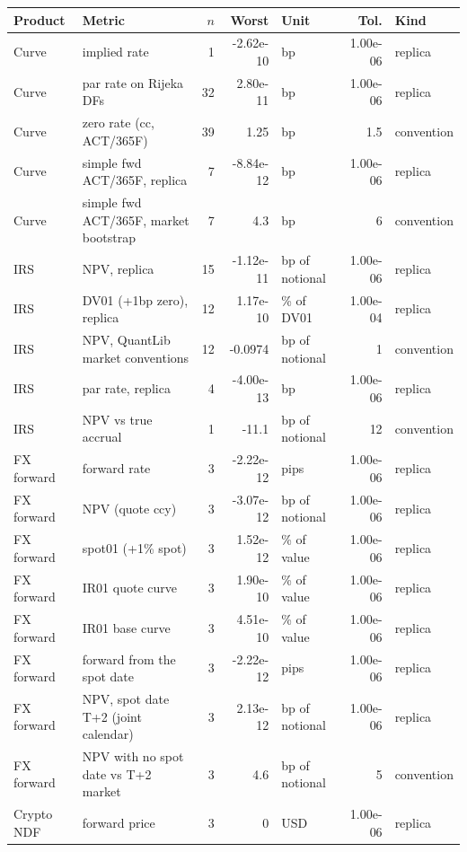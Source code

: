 \documentclass[11pt,a4paper]{article}
\begin{document}
{\small\setlength{\tabcolsep}{4pt}
\begin{longtable}{>{\raggedright\arraybackslash}p{2.2cm}>{\raggedright\arraybackslash}p{4.6cm} r r >{\raggedright\arraybackslash}p{1.8cm} r >{\raggedright\arraybackslash}p{1.8cm}}
\toprule
Product & Metric & $n$ & Worst & Unit & Tol. & Kind\\
\midrule
\endhead
Curve & implied rate & 1 & -2.62e-10 & bp & 1.00e-06 & replica \\
Curve & par rate on Rijeka DFs & 32 & 2.80e-11 & bp & 1.00e-06 & replica \\
Curve & zero rate (cc, ACT/365F) & 39 & 1.25 & bp & 1.5 & convention \\
Curve & simple fwd ACT/365F, replica & 7 & -8.84e-12 & bp & 1.00e-06 & replica \\
Curve & simple fwd ACT/365F, market bootstrap & 7 & 4.3 & bp & 6 & convention \\
IRS & NPV, replica & 15 & -1.12e-11 & bp of notional & 1.00e-06 & replica \\
IRS & DV01 (+1bp zero), replica & 12 & 1.17e-10 & \% of DV01 & 1.00e-04 & replica \\
IRS & NPV, QuantLib market conventions & 12 & -0.0974 & bp of notional & 1 & convention \\
IRS & par rate, replica & 4 & -4.00e-13 & bp & 1.00e-06 & replica \\
IRS & NPV vs true accrual & 1 & -11.1 & bp of notional & 12 & convention \\
FX forward & forward rate & 3 & -2.22e-12 & pips & 1.00e-06 & replica \\
FX forward & NPV (quote ccy) & 3 & -3.07e-12 & bp of notional & 1.00e-06 & replica \\
FX forward & spot01 (+1\% spot) & 3 & 1.52e-12 & \% of value & 1.00e-06 & replica \\
FX forward & IR01 quote curve & 3 & 1.90e-10 & \% of value & 1.00e-06 & replica \\
FX forward & IR01 base curve & 3 & 4.51e-10 & \% of value & 1.00e-06 & replica \\
FX forward & forward from the spot date & 3 & -2.22e-12 & pips & 1.00e-06 & replica \\
FX forward & NPV, spot date T+2 (joint calendar) & 3 & 2.13e-12 & bp of notional & 1.00e-06 & replica \\
FX forward & NPV with no spot date vs T+2 market & 3 & 4.6 & bp of notional & 5 & convention \\
Crypto NDF & forward price & 3 & 0 & USD & 1.00e-06 & replica \\

\end{longtable}}
\end{document}
